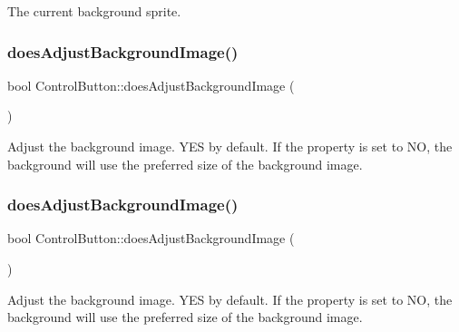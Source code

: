 The current background sprite. \mbox{\label{classControlButton_a35b9bc222f10096a0c9122dc87ae82aa}} 
\subsubsection{\texorpdfstring{does\+Adjust\+Background\+Image()}{doesAdjustBackgroundImage()}\hspace{0.1cm}{\footnotesize\ttfamily [1/2]}}
{\footnotesize\ttfamily bool Control\+Button\+::does\+Adjust\+Background\+Image (\begin{DoxyParamCaption}{ }\end{DoxyParamCaption})}

Adjust the background image. Y\+ES by default. If the property is set to NO, the background will use the preferred size of the background image. \mbox{\label{classControlButton_a35b9bc222f10096a0c9122dc87ae82aa}} 
\subsubsection{\texorpdfstring{does\+Adjust\+Background\+Image()}{doesAdjustBackgroundImage()}\hspace{0.1cm}{\footnotesize\ttfamily [2/2]}}
{\footnotesize\ttfamily bool Control\+Button\+::does\+Adjust\+Background\+Image (\begin{DoxyParamCaption}{ }\end{DoxyParamCaption})}

Adjust the background image. Y\+ES by default. If the property is set to NO, the background will use the preferred size of the background image. \mbox{\label{classControlButton_a07ae47cf7ce5f8b91cedf311ebf9690f}} 
